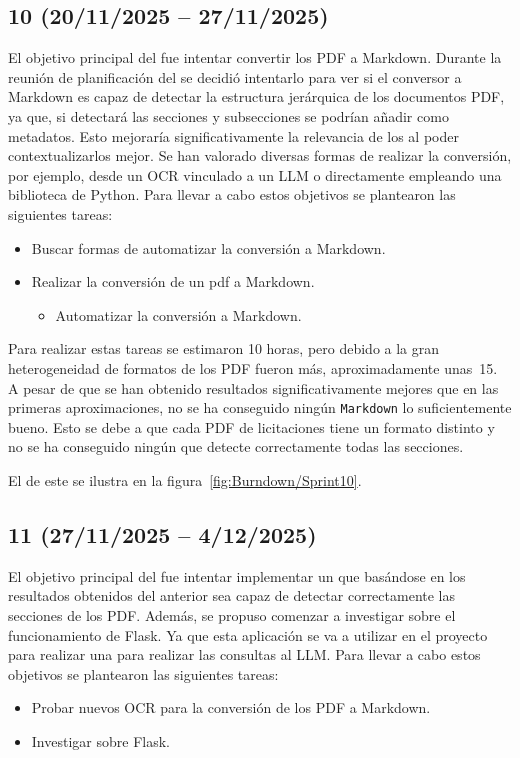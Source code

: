 \subsection{ 10 (20/11/2025 -- 27/11/2025)}
El objetivo principal del  fue intentar convertir los PDF a Markdown. Durante la reunión de planificación del  se decidió intentarlo para ver si el conversor a Markdown es capaz de detectar la estructura jerárquica de los documentos PDF, ya que, si detectará las secciones y subsecciones se podrían añadir como metadatos. Esto mejoraría significativamente la relevancia de los  al poder contextualizarlos mejor. Se han valorado diversas formas de realizar la conversión, por ejemplo, desde un OCR vinculado a un LLM o directamente empleando una biblioteca de Python. Para llevar a cabo estos objetivos se plantearon las siguientes tareas:
\begin{itemize}
\tightlist
	\item Buscar formas de automatizar la conversión a Markdown.
	\item Realizar la conversión de un pdf a Markdown.
	\begin{itemize}
	\tightlist
		\item Automatizar la conversión a Markdown.
	\end{itemize}
\end{itemize}

Para realizar estas tareas se estimaron 10 horas, pero debido a la gran heterogeneidad de formatos de los PDF fueron más, aproximadamente unas~15. A pesar de que se han obtenido resultados significativamente mejores que en las primeras aproximaciones, no se ha conseguido ningún \texttt{Markdown} lo suficientemente bueno. Esto se debe a que cada PDF de licitaciones tiene un formato distinto y no se ha conseguido ningún  que detecte correctamente todas las secciones.

El  de este  se ilustra en la figura~\ref{fig:Burndown/Sprint10}.

\subsection{ 11 (27/11/2025 -- 4/12/2025)}
El objetivo principal del  fue intentar implementar un  que basándose en los resultados obtenidos del anterior sea capaz de detectar correctamente las secciones de los PDF. Además, se propuso comenzar a investigar sobre el funcionamiento de Flask. Ya que esta aplicación se va a utilizar en el proyecto para realizar una  para realizar las consultas al LLM. Para llevar a cabo estos objetivos se plantearon las siguientes tareas:
\begin{itemize}
\tightlist
	\item Probar nuevos OCR para la conversión de los PDF a Markdown.
	\item Investigar sobre Flask.
\end{itemize}

